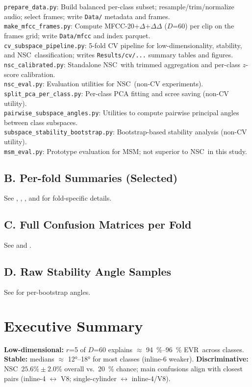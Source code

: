 \documentclass[11pt]{article}
\newcommand{\D}{\ensuremath{D}\xspace}
\newcommand{\rankr}{\ensuremath{r}\xspace}
\newcommand{\EVR}{EVR\xspace}
\newcommand{\NSC}{NSC\xspace}
\begin{document}
\texttt{prepare\_data.py}: Build balanced per-class subset; resample/trim/normalize audio; select frames; write \texttt{Data/} metadata and frames. \\
\texttt{make\_mfcc\_frames.py}: Compute MFCC-20+$\Delta$+$\Delta\Delta$ (\D=60) per clip on the frames grid; write \texttt{Data/mfcc} and index parquet. \\
\texttt{cv\_subspace\_pipeline.py}: 5-fold CV pipeline for low-dimensionality, stability, and \NSC\ classification; writes \texttt{Results/cv/...} summary tables and figures. \\
\texttt{nsc\_calibrated.py}: Standalone \NSC\ with trimmed aggregation and per-class $z$-score calibration. \\
\texttt{nsc\_eval.py}: Evaluation utilities for \NSC\ (non-CV experiments). \\
\texttt{split\_pca\_per\_class.py}: Per-class PCA fitting and scree saving (non-CV utility). \\
\texttt{pairwise\_subspace\_angles.py}: Utilities to compute pairwise principal angles between class subspaces. \\
\texttt{subspace\_stability\_bootstrap.py}: Bootstrap-based stability analysis (non-CV utility). \\
\texttt{msm\_eval.py}: Prototype evaluation for MSM; not superior to \NSC\ in this study.

\subsection*{B. Per-fold Summaries (Selected)}
See , , , and  for fold-specific details.

\subsection*{C. Full Confusion Matrices per Fold}
See  and .

\subsection*{D. Raw Stability Angle Samples}
See  for per-bootstrap angles.

\section*{Executive Summary}
\textbf{Low-dimensional:} \rankr=5 of \D=60 explains $\approx$ \SIrange{94}{96}{\percent} \EVR\ across classes. \textbf{Stable:} medians $\approx$ \ang{12}--\ang{18} for most classes (inline-6 weaker). \textbf{Discriminative:} \NSC\ $25.6\% \pm 2.0\%$ overall vs.\ \SI{20}{\percent} chance; main confusions align with closest pairs (inline-4 $\leftrightarrow$ V8; single-cylinder $\leftrightarrow$ inline-4/V8).
\end{document}
